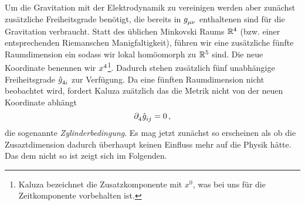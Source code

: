 Um die Gravitation mit der Elektrodynamik zu vereinigen werden aber zunächst 
zusätzliche Freiheitsgrade benötigt, die bereits in $\tensor{g}{_\mu_\nu}$
enthaltenen sind für die Gravitation verbraucht.
Statt des üblichen Minkovski Raums $\mathbb{R}^4$ (bzw. einer entsprechenden
Riemanschen Manigfaltigkeit), führen wir eine zusätzliche fünfte Raumdimension
ein sodass wir lokal homöomorph zu $\mathbb{R}^5$ sind. 
Die neue Koordinate benennen wir $\tensor{x}{^4}$\footnote{Kaluza
bezeichnet die Zusatzkomponente mit $x^0$, was bei uns für die Zeitkomponente
vorbehalten ist.}.
Dadurch stehen zusätzlich fünf
unabhängige Freiheitsgrade $\tensor{\hat{g}}{_4_i}$ zur Verfügung. Da eine
fünften Raumdimension nicht beobachtet wird, fordert Kaluza zuätzlich das die
Metrik nicht von der neuen Koordinate abhängt
\begin{equation}
\tensor{\partial}{_4} \tensor{\hat{g}}{_i_j}=0\,,\label{eq:Zylinderbed}
\end{equation}
die sogenannte \emph{Zylinderbedingung}.
Es mag jetzt zunächst so erscheinen als ob die Zusaztdimension dadurch überhaupt
keinen Einfluss mehr auf die Physik hätte. Das dem nicht so ist zeigt sich im
Folgenden.

